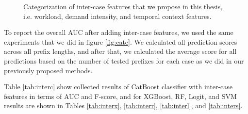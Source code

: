 \begin{figure}[!htb]
	\begin{center}
		\caption[Inter-case features]{Categorization of inter-case features that we propose in this thesis, i.e. workload, demand intensity, and temporal context features.
		}
		\label{fig:interr}
	\end{center}
\end{figure}




To report the overall AUC after adding inter-case features, we used the same experiments that we did in figure \ref{fig:cate}. We calculated all prediction scores across all prefix lengths, and after that, we calculated the average score for all predictions based on the number of tested prefixes for each case as we did in our previously proposed methods. 

Table \ref{tab:interc} show collected results of CatBoost classifier with inter-case features in terms of AUC and F-score, and for XGBoost, RF, Logit, and SVM results are shown in Tables \ref{tab:interx}, \ref{tab:interr}, \ref{tab:interl}, and \ref{tab:inters}.


